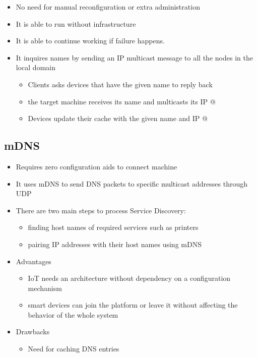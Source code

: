 \begin{itemize}
	\item No need for manual reconfiguration or extra administration
	\item It is able to run without infrastructure
	\item It is able to continue working if failure happens.
	\item It inquires names by sending an IP multicast message to all the nodes in the local domain
	\begin{itemize}
		\item Clients asks devices that have the given name to reply back
		\item the target machine receives its name and multicasts its IP @
		\item Devices update their cache with the given name and IP @
	\end{itemize}
\end{itemize}

\subsection{mDNS}

\begin{itemize}
	\item Requires zero configuration aids to connect machine
	\item It uses mDNS to send DNS packets to specific multicast addresses through UDP
	\item There are two main steps to process Service Discovery:
	\begin{itemize}
		\item finding host names of required services such as printers
		\item pairing IP addresses with their host names using mDNS
	\end{itemize}
	\item Advantages
	\begin{itemize}
		\item IoT needs an architecture without dependency on a configuration mechanism
		\item smart devices can join the platform or leave it without affecting the behavior of the whole system
	\end{itemize}
	\item Drawbacks
	\begin{itemize}
		\item Need for caching DNS entries
	\end{itemize}
\end{itemize}







